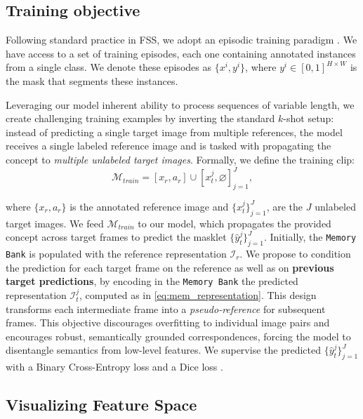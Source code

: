 \subsection{Training  objective}
\label{sec:training}
Following standard practice in FSS, we adopt an episodic training paradigm \cite{vinyals2016matching, shaban2017one, wang2019panet, lang2022learning}.
We have access to a set of training episodes, each one containing annotated instances from a single class. We denote these episodes as $\{ x^i, y^i \}$, where $y^i \in [0,1]^{H \times W}$ is the mask that segments these instances.

Leveraging our model inherent ability to process sequences of variable length, we create challenging training examples by inverting the standard $k$-shot setup: instead of predicting a single target image from multiple references, the model receives a single labeled reference image and is tasked with propagating the concept to \textit{multiple unlabeled target images}. Formally, we define the training clip:
\begin{equation}
\mathcal{M}_{train} = [x_r, a_r] \cup [x^j_t, \varnothing]^J_{j=1},
\end{equation}

where $\{ x_r, a_r\}$ is the annotated reference image and $\{ x^j_t\}_{j=1}^J$, are the $J$ unlabeled target images. We feed $\mathcal{M}_{train}$ to our model, which propagates the provided concept across target frames to predict the masklet $\{ \hat{y}^j_t\}_{j=1}^J$.
Initially, the \texttt{Memory Bank} is populated with the reference representation $\mathcal{I}_r$.
We propose to condition the prediction for each target frame on the reference as well as on \textbf{previous target predictions}, by encoding in the \texttt{Memory Bank} the predicted representation $\mathcal{I}_t^j$, computed as in \cref{eq:mem_representation}.  This design transforms each intermediate frame into a \textit{pseudo-reference} for subsequent frames. This objective discourages overfitting to individual image pairs and encourages robust, semantically grounded correspondences, forcing the model to disentangle semantics from low-level features. 
We supervise the predicted
$\{ \hat{y}^j_t\}_{j=1}^J$ with a Binary Cross-Entropy loss and a Dice loss \cite{milletari2016v}.


\subsection{Visualizing \ours{} Feature Space}
\label{sec:feature_analysis}

